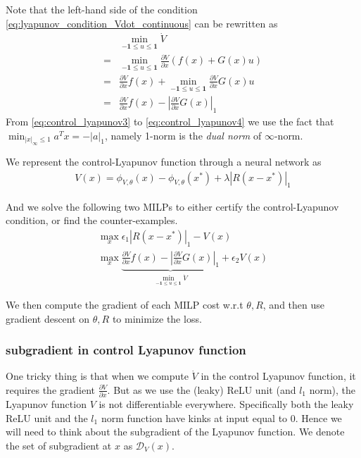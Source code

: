 \documentclass{article}
\begin{document}
Note that the left-hand side of the condition \eqref{eq:lyapunov_condition_Vdot_continuous} can be rewritten as
\begin{subequations}
\begin{align}
	&\min_{-\mathbf{1}\le u \le \mathbf{1}} \dot{V}\\
	=&\min_{-\mathbf{1}\le u \le\mathbf{1}}\frac{\partial V}{\partial x}(f(x) + G(x)u)\\
	=&\frac{\partial V}{\partial x}f(x) + \min_{-\mathbf{1}\le u \le \mathbf{1}} \frac{\partial V}{\partial x}G(x)u\label{eq:control_lyapunov3}\\
	=&\frac{\partial V}{\partial x}f(x) - \left|\frac{\partial V}{\partial x}G(x)\right|_1\label{eq:control_lyapunov4}
\end{align}
\end{subequations}
From \eqref{eq:control_lyapunov3} to \eqref{eq:control_lyapunov4} we use the fact that $\min_{|x|_{\infty}\le 1} a^Tx = -|a|_1$, namely 1-norm is the \textit{dual norm} of $\infty$-norm.

We represent the control-Lyapunov function through a neural network as
\begin{align}
	V(x) = \phi_{V, \theta}(x) - \phi_{V, \theta}(x^*) + \lambda|R(x-x^*)|_1
\end{align}

And we solve the following two MILPs to either certify the control-Lyapunov condition, or find the counter-examples.
\begin{align}
	\max_{x} \epsilon_1|R(x-x^*)|_1 - V(x)\\
	\max_{x} \underbrace{\frac{\partial V}{\partial x}f(x) - \left|\frac{\partial V}{\partial x}G(x)\right|_1}_{\min_{-\mathbf{1}\le u \le \mathbf{1}} \dot{V}} + \epsilon_2V(x)
\end{align}

We then compute the gradient of each MILP cost w.r.t $\theta, R$, and then use gradient descent on $\theta, R$ to minimize the loss.

\subsubsection{subgradient in control Lyapunov function}
One tricky thing is that when we compute $\dot{V}$ in the control Lyapunov function, it requires the gradient $\frac{\partial V}{\partial x}$. But as we use the (leaky) ReLU unit (and $l_1$ norm), the Lyapunov function $V$ is not differentiable everywhere. Specifically both the leaky ReLU unit and the $l_1$ norm function have kinks at input equal to 0. Hence we will need to think about the subgradient of the Lyapunov function. We denote the set of subgradient at $x$ as $\mathcal{D}_V(x)$.
\end{document}
